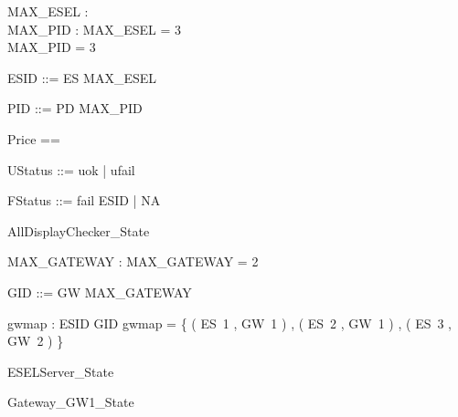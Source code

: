 \documentclass{article}
\begin{document}

\begin{axdef}
	MAX\_ESEL : \nat \\
 MAX\_PID : \nat 
\where
 MAX\_ESEL = 3 \\
 MAX\_PID = 3
\end{axdef}

\begin{zed}
	ESID ::= ES  \upto MAX\_ESEL \rdata
\end{zed}

\begin{zed}
	PID ::= PD  \upto MAX\_PID \rdata
\end{zed}

\begin{zed}
	Price == \nat
\end{zed}

\begin{zed}
	UStatus ::= uok | ufail
\end{zed}

\begin{zed}
	FStatus ::= fail \ldata ESID \rdata | NA
\end{zed}

\begin{zed}
	AllDisplayChecker\_State 
\end{zed}

\begin{axdef}
	MAX\_GATEWAY : \nat 
\where
 MAX\_GATEWAY = 2
\end{axdef}

\begin{zed}
	GID ::= GW  \upto MAX\_GATEWAY \rdata
\end{zed}

\begin{axdef}
	gwmap : ESID \fun GID 
\where
 gwmap = \{ ( ES~1 , GW~1 ) , ( ES~2 , GW~1 ) , ( ES~3 , GW~2 ) \}
\end{axdef}

\begin{zed}
	ESELServer\_State 
\end{zed}

\begin{zed}
	Gateway\_GW1\_State 
\end{zed}
\end{document}
